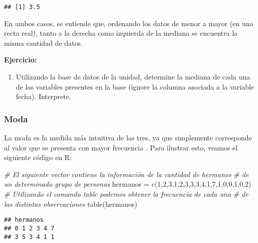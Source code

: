 \documentclass[
]{book}
\newenvironment{Shaded}{\begin{snugshade}}{\end{snugshade}}
\newcommand{\CommentTok}[1]{\textcolor[rgb]{0.56,0.35,0.01}{\textit{#1}}}
\newcommand{\DecValTok}[1]{\textcolor[rgb]{0.00,0.00,0.81}{#1}}
\newcommand{\FunctionTok}[1]{\textcolor[rgb]{0.00,0.00,0.00}{#1}}
\newcommand{\NormalTok}[1]{#1}
\newcommand{\OtherTok}[1]{\textcolor[rgb]{0.56,0.35,0.01}{#1}}
\providecommand{\tightlist}{%
  \setlength{\itemsep}{0pt}\setlength{\parskip}{0pt}}
\begin{document}
\begin{verbatim}
## [1] 3.5
\end{verbatim}

En ambos casos, se entiende que, ordenando los datos de menor a mayor (en una recta real), tanto a la derecha como izquierda de la mediana se encuentra la misma cantidad de datos.

\textbf{Ejercicio:}

\begin{enumerate}
\def\labelenumi{\arabic{enumi}.}
\tightlist
\item
  Utilizando la base de datos de la unidad, determine la mediana de cada una de las variables presentes en la base (ignore la columna asociada a la variable fecha). Interprete.
\end{enumerate}

\hypertarget{moda}{%
\subsubsection*{Moda}\label{moda}}

La moda es la medida más intuitiva de las tres, ya que simplemente corresponde al valor que se presenta con mayor frecuencia \citep[página 85]{anderson}. Para ilustrar esto, veamos el siguiente código en R:

\begin{Shaded}
\begin{Highlighting}[]
\CommentTok{\# El siguiente vector contiene la información de la cantidad de hermanos }
\CommentTok{\# de un determinado grupo de personas}
\NormalTok{hermanos }\OtherTok{=} \FunctionTok{c}\NormalTok{(}\DecValTok{1}\NormalTok{,}\DecValTok{2}\NormalTok{,}\DecValTok{3}\NormalTok{,}\DecValTok{1}\NormalTok{,}\DecValTok{2}\NormalTok{,}\DecValTok{3}\NormalTok{,}\DecValTok{3}\NormalTok{,}\DecValTok{3}\NormalTok{,}\DecValTok{4}\NormalTok{,}\DecValTok{1}\NormalTok{,}\DecValTok{7}\NormalTok{,}\DecValTok{1}\NormalTok{,}\DecValTok{0}\NormalTok{,}\DecValTok{0}\NormalTok{,}\DecValTok{1}\NormalTok{,}\DecValTok{0}\NormalTok{,}\DecValTok{2}\NormalTok{)}
\CommentTok{\# Utilizando el comando table podemos obtener la frecuencia de cada una }
\CommentTok{\# de las distintas observaciones}
\FunctionTok{table}\NormalTok{(hermanos)}
\end{Highlighting}
\end{Shaded}

\begin{verbatim}
## hermanos
## 0 1 2 3 4 7 
## 3 5 3 4 1 1
\end{verbatim}
\end{document}

